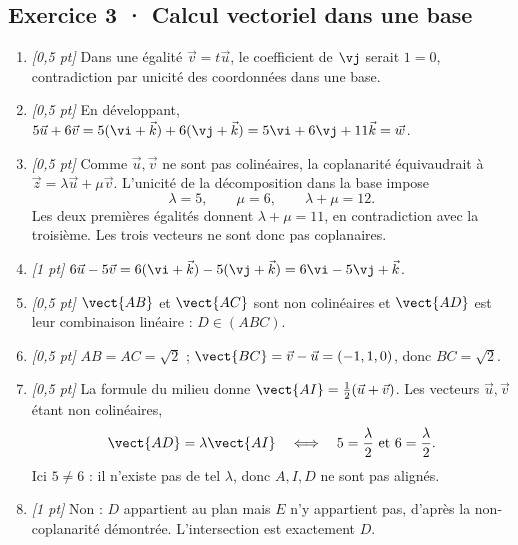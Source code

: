 \subsection*{Exercice 3 · Calcul vectoriel dans une base}\begin{enumerate}

\item \textit{[0,5 pt]} Dans une égalité $\vec v=t\vec u$, le coefficient de $\vj $ serait $1=0$, contradiction par unicité des coordonnées dans une base.

\item \textit{[0,5 pt]} En développant, $5\vec u+6\vec v=5(\vi +\vec k)+6(\vj +\vec k)=5\vi +6\vj +11\vec k=\vec w$.

\item \textit{[0,5 pt]} Comme $\vec u,\vec v$ ne sont pas colinéaires, la coplanarité équivaudrait à $\vec z=\lambda\vec u+\mu\vec v$. L'unicité de la décomposition dans la base impose
\[\lambda=5,\qquad\mu=6,\qquad\lambda+\mu=12.\]
Les deux premières égalités donnent $\lambda+\mu=11$, en contradiction avec la troisième. Les trois vecteurs ne sont donc pas coplanaires.

\item \textit{[1 pt]} $6\vec u-5\vec v=6(\vi +\vec k)-5(\vj +\vec k)=6\vi -5\vj +\vec k$.

\item \textit{[0,5 pt]} $\vect{AB}$ et $\vect{AC}$ sont non colinéaires et $\vect{AD}$ est leur combinaison linéaire : $D\in(ABC)$.

\item \textit{[0,5 pt]} $AB=AC=\sqrt2$ ; $\vect{BC}=\vec v-\vec u=(-1,1,0)$, donc $BC=\sqrt2$.

\item \textit{[0,5 pt]} La formule du milieu donne $\vect{AI}=\frac12(\vec u+\vec v)$. Les vecteurs $\vec u,\vec v$ étant non colinéaires,
\[\vect{AD}=\lambda\vect{AI}\quad\Longleftrightarrow\quad 5=\frac{\lambda}{2}\ \text{et}\ 6=\frac{\lambda}{2}.\]
Ici $5\ne 6$ : il n'existe pas de tel $\lambda$, donc $A,I,D$ ne sont pas alignés.

\item \textit{[1 pt]} Non : $D$ appartient au plan mais $E$ n'y appartient pas, d'après la non-coplanarité démontrée. L'intersection est exactement $D$.

\end{enumerate}

